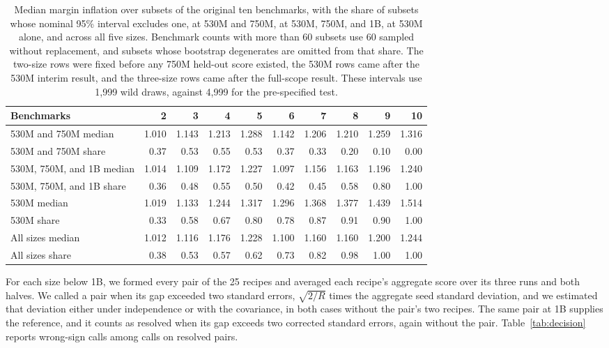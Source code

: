 \begin{table}[!htb]
\centering
\caption{Median margin inflation over subsets of the original ten benchmarks, with the share of subsets whose nominal 95\% interval excludes one, at 530M and 750M, at 530M, 750M, and 1B, at 530M alone, and across all five sizes. Benchmark counts with more than 60 subsets use 60 sampled without replacement, and subsets whose bootstrap degenerates are omitted from that share. The two-size rows were fixed before any 750M held-out score existed, the 530M rows came after the 530M interim result, and the three-size rows came after the full-scope result. These intervals use 1,999 wild draws, against 4,999 for the pre-specified test.}
\label{tab:battery}
\small\setlength{\tabcolsep}{4pt}\renewcommand{\arraystretch}{1.12}
\begin{tabular}{lrrrrrrrrr}
\toprule
Benchmarks & 2 & 3 & 4 & 5 & 6 & 7 & 8 & 9 & 10\\
\midrule
530M and 750M median & 1.010 & 1.143 & 1.213 & 1.288 & 1.142 & 1.206 & 1.210 & 1.259 & 1.316\\
530M and 750M share & 0.37 & 0.53 & 0.55 & 0.53 & 0.37 & 0.33 & 0.20 & 0.10 & 0.00\\
530M, 750M, and 1B median & 1.014 & 1.109 & 1.172 & 1.227 & 1.097 & 1.156 & 1.163 & 1.196 & 1.240\\
530M, 750M, and 1B share & 0.36 & 0.48 & 0.55 & 0.50 & 0.42 & 0.45 & 0.58 & 0.80 & 1.00\\
530M median & 1.019 & 1.133 & 1.244 & 1.317 & 1.296 & 1.368 & 1.377 & 1.439 & 1.514\\
530M share & 0.33 & 0.58 & 0.67 & 0.80 & 0.78 & 0.87 & 0.91 & 0.90 & 1.00\\
All sizes median & 1.012 & 1.116 & 1.176 & 1.228 & 1.100 & 1.160 & 1.160 & 1.200 & 1.244\\
All sizes share & 0.38 & 0.53 & 0.57 & 0.62 & 0.73 & 0.82 & 0.98 & 1.00 & 1.00\\
\bottomrule
\end{tabular}
\end{table}
\label{app:decision}
For each size below 1B, we formed every pair of the 25 recipes and averaged each recipe's aggregate score over its three runs and both halves. We called a pair when its gap exceeded two standard errors, $\sqrt{2/R}$ times the aggregate seed standard deviation, and we estimated that deviation either under independence or with the covariance, in both cases without the pair's two recipes. The same pair at 1B supplies the reference, and it counts as resolved when its gap exceeds two corrected standard errors, again without the pair. Table~\ref{tab:decision} reports wrong-sign calls among calls on resolved pairs.

